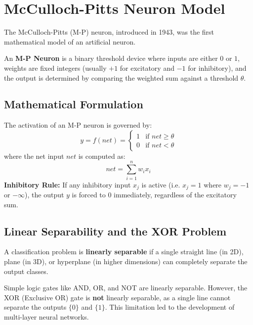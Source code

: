\documentclass[12pt,a4paper]{article}
\begin{document}
\section{McCulloch-Pitts Neuron Model}

The McCulloch-Pitts (M-P) neuron, introduced in 1943, was the first mathematical model of an artificial neuron.

\begin{tcolorbox}[defbox, title={McCulloch-Pitts Neuron}]
An \textbf{M-P Neuron} is a binary threshold device where inputs are either $0$ or $1$, weights are fixed integers (usually $+1$ for excitatory and $-1$ for inhibitory), and the output is determined by comparing the weighted sum against a threshold $\theta$.
\end{tcolorbox}

\subsection{Mathematical Formulation}
The activation of an M-P neuron is governed by:
\begin{equation}
  y = f(net) = \begin{cases} 1 & \text{if } net \ge \theta \\ 0 & \text{if } net < \theta \end{cases}
\end{equation}
where the net input $net$ is computed as:
\begin{equation}
  net = \sum_{i=1}^n w_i x_i
\end{equation}
\textbf{Inhibitory Rule:} If any inhibitory input $x_j$ is active (i.e. $x_j = 1$ where $w_j = -1$ or $-\infty$), the output $y$ is forced to $0$ immediately, regardless of the excitatory sum.

\subsection{Linear Separability and the XOR Problem}
A classification problem is \textbf{linearly separable} if a single straight line (in 2D), plane (in 3D), or hyperplane (in higher dimensions) can completely separate the output classes.
\par\noindent
Simple logic gates like AND, OR, and NOT are linearly separable. However, the XOR (Exclusive OR) gate is \textbf{not} linearly separable, as a single line cannot separate the outputs $\{0\}$ and $\{1\}$. This limitation led to the development of multi-layer neural networks.
\end{document}
